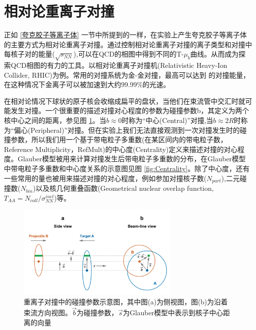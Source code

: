 \section{相对论重离子对撞}

正如 \ref{夸克胶子等离子体} 一节中所提到的一样，在实验上产生夸克胶子等离子体的主要方式为相对论重离子对撞。通过控制相对论重离子对撞的离子类型和对撞中每核子对的能量($\sqrt{s_{NN}}$),可以在QCD的相图中得到不同的T-$\mu_b$曲线。从而成为探索QCD相图的有力的工具。以相对论重离子对撞机(Relativistic Heavy-Ion Collider, RHIC)为例。常用的对撞系统为金-金对撞，最高可以达到 \sNNerbai 的对撞能量，在这种情况下金离子可以被加速到大约99.99\%的光速。

在相对论情况下球状的原子核会收缩成扁平的盘状，当他们在束流管中交汇时就可能发生对撞。一个很重要的描述对撞对心程度的参数为碰撞参数b，其定义为两个核中心之间的距离，参见图 \ref{fig:ImpactParameter}。当$b \approx 0$时称为“中心(Central)”对撞,当$b \approx 2R$时称为“偏心(Peripheral)”对撞。但在实验上我们无法直接观测到一次对撞发生时的碰撞参数，所以我们用一个基于带电粒子多重数(在某区间内的带电粒子数，Reference Multiplicity，RefMult)的中心度(Centrality)定义来描述对撞的对心程度。Glauber模型被用来计算对撞发生后带电粒子多重数的分布，在Glauber模型中带电粒子多重数和中心度关系的示意图见图 \ref{fig:Centrality}。除了中心度，还有一些常用的量也被用来描述对撞的对心程度，例如参加对撞核子数($N_{part}$),二元碰撞数($N_{bin}$)以及核几何重叠函数(Geometrical nuclear overlap function, $T_{AA} = N_{coll}/\sigma_{NN}^{inel}$)等。

\begin{figure}[htb]
    \begin{center}
    \includegraphics[width=0.7\textwidth,clip]{figures/Chapter1/ImpactParameter.png}
    \end{center}
    \caption[重离子对撞中的碰撞参数示意图]{重离子对撞中的碰撞参数示意图，其中图(a)为侧视图，图(b)为沿着束流方向视图。$\overrightarrow{b}$为碰撞参数，$\overrightarrow{s}$为Glauber模型中表示到核子中心距离的向量}
    \label{fig:ImpactParameter}
\end{figure}

